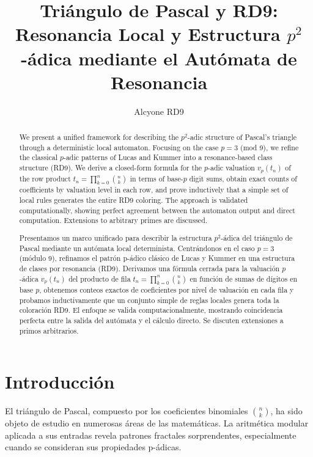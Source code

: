 \documentclass[12pt]{article}
\title{Triángulo de Pascal y RD9: Resonancia Local y Estructura $p^2$-ádica mediante el Autómata de Resonancia}
\author{Alcyone RD9}
\date{}
\begin{document}
\maketitle

\begin{abstract}
We present a unified framework for describing the $p^2$-adic structure of Pascal's triangle through a deterministic local automaton. Focusing on the case $p=3$ (mod 9), we refine the classical $p$-adic patterns of Lucas and Kummer into a resonance-based class structure (RD9). We derive a closed-form formula for the $p$-adic valuation $v_p(t_n)$ of the row product $t_n = \prod_{k=0}^n \binom{n}{k}$ in terms of base-$p$ digit sums, obtain exact counts of coefficients by valuation level in each row, and prove inductively that a simple set of local rules generates the entire RD9 coloring. The approach is validated computationally, showing perfect agreement between the automaton output and direct computation. Extensions to arbitrary primes are discussed.
\end{abstract}

\begin{abstract}
Presentamos un marco unificado para describir la estructura $p^2$-ádica del triángulo de Pascal mediante un autómata local determinista. Centrándonos en el caso $p=3$ (módulo 9), refinamos el patrón p-ádico clásico de Lucas y Kummer en una estructura de clases por resonancia (RD9). Derivamos una fórmula cerrada para la valuación $p$-ádica $v_p(t_n)$ del producto de fila $t_n = \prod_{k=0}^n \binom{n}{k}$ en función de sumas de dígitos en base $p$, obtenemos conteos exactos de coeficientes por nivel de valuación en cada fila y probamos inductivamente que un conjunto simple de reglas locales genera toda la coloración RD9. El enfoque se valida computacionalmente, mostrando coincidencia perfecta entre la salida del autómata y el cálculo directo. Se discuten extensiones a primos arbitrarios.
\end{abstract}

\section{Introducción}

El triángulo de Pascal, compuesto por los coeficientes binomiales $\binom{n}{k}$, ha sido objeto de estudio en numerosas áreas de las matemáticas. La aritmética modular aplicada a sus entradas revela patrones fractales sorprendentes, especialmente cuando se consideran sus propiedades p-ádicas.
\end{document}
